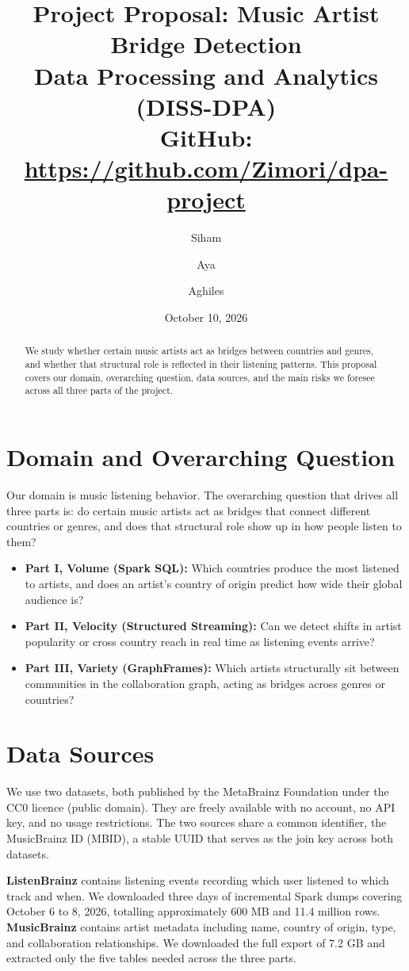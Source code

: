 \documentclass[10pt,a4paper,twocolumn]{article}
\title{
    \large\textbf{Project Proposal: Music Artist Bridge Detection} \\
    \normalsize Data Processing and Analytics (DISS-DPA) \\
    \normalsize GitHub: \url{https://github.com/Zimori/dpa-project}
}
\author{Siham \and Aya \and Aghiles}
\date{October 10, 2026}
\begin{document}
\maketitle

\begin{abstract}
We study whether certain music artists act as bridges between countries and genres, and whether that structural role is reflected in their listening patterns. This proposal covers our domain, overarching question, data sources, and the main risks we foresee across all three parts of the project.
\end{abstract}

\section{Domain and Overarching Question}

Our domain is music listening behavior. The overarching question that drives all three parts is: do certain music artists act as bridges that connect different countries or genres, and does that structural role show up in how people listen to them?

\begin{itemize}
  \item \textbf{Part I, Volume (Spark SQL):} Which countries produce the most listened to artists, and does an artist's country of origin predict how wide their global audience is?
  \item \textbf{Part II, Velocity (Structured Streaming):} Can we detect shifts in artist popularity or cross country reach in real time as listening events arrive?
  \item \textbf{Part III, Variety (GraphFrames):} Which artists structurally sit between communities in the collaboration graph, acting as bridges across genres or countries?
\end{itemize}

\section{Data Sources}

We use two datasets, both published by the MetaBrainz Foundation under the CC0 licence (public domain). They are freely available with no account, no API key, and no usage restrictions. The two sources share a common identifier, the MusicBrainz ID (MBID), a stable UUID that serves as the join key across both datasets.

\textbf{ListenBrainz} contains listening events recording which user listened to which track and when. We downloaded three days of incremental Spark dumps covering October 6 to 8, 2026, totalling approximately 600 MB and 11.4 million rows. \textbf{MusicBrainz} contains artist metadata including name, country of origin, type, and collaboration relationships. We downloaded the full export of 7.2 GB and extracted only the five tables needed across the three parts.
\end{document}
